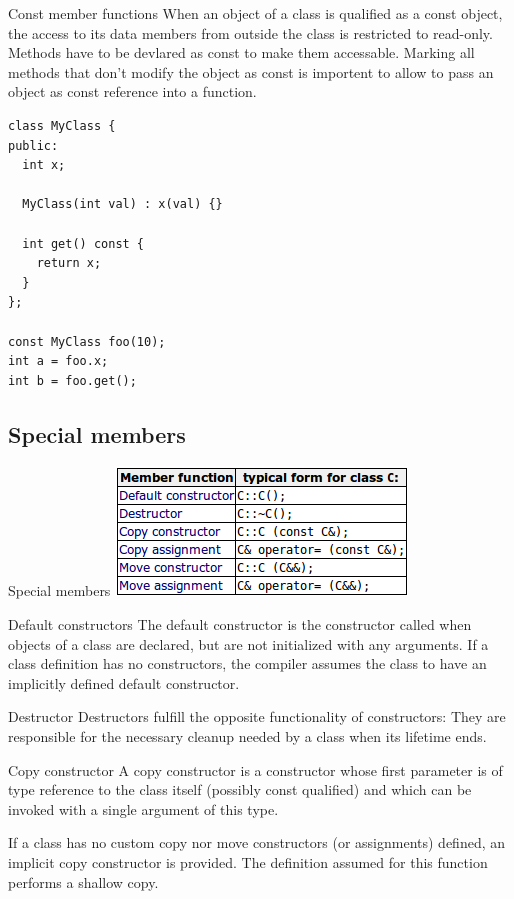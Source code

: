 \documentclass{beamer}
\begin{document}
\begin{frame}[fragile]{Const member functions}
When an object of a class is qualified as a const object, the access to its data
members from outside the class is restricted to read-only. Methods have to be
devlared as const to make them accessable. Marking all methods that don't modify
the object as const is importent to allow to pass an object as const reference
into a function.

\begin{lstlisting}
class MyClass {
public:
  int x;

  MyClass(int val) : x(val) {}

  int get() const {
    return x;
  }
};

const MyClass foo(10);
int a = foo.x;
int b = foo.get();
\end{lstlisting}

\end{frame}

\subsection{Special members}
\begin{frame}{Special members}
\includegraphics[scale=0.4]{img/SpecialMembers.png}
\end{frame}

\begin{frame}{Default constructors}
The default constructor is the constructor called when objects of a class are
declared, but are not initialized with any arguments. If a class definition has
no constructors, the compiler assumes the class to have an implicitly defined
default constructor.
\end{frame}

\begin{frame}{Destructor}
Destructors fulfill the opposite functionality of constructors: They are
responsible for the necessary cleanup needed by a class when its lifetime ends.
\end{frame}

\begin{frame}{Copy constructor}
A copy constructor is a constructor whose first parameter is of type reference
to the class itself (possibly const qualified) and which can be invoked with a
single argument of this type. 
\par
If a class has no custom copy nor move constructors (or assignments) defined, an
implicit copy constructor is provided. The definition assumed for this function
performs a shallow copy. 
\end{frame}
\end{document}
